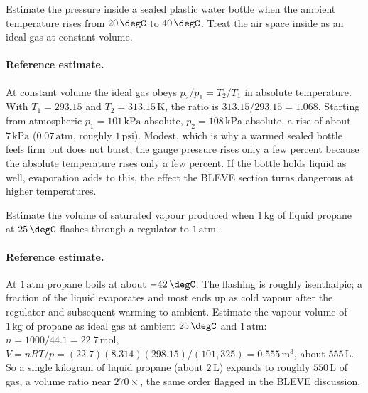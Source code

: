 \begin{exercise}
Estimate the pressure inside a sealed plastic water bottle when the
ambient temperature rises from $20\,\degC$ to $40\,\degC$. Treat the
air space inside as an ideal gas at constant volume.

\paragraph{Reference estimate.} At constant volume the ideal gas obeys
$p_2/p_1 = T_2/T_1$ in absolute temperature. With $T_1 = 293.15$ and
$T_2 = 313.15\,\si{\kelvin}$, the ratio is $313.15/293.15 = 1.068$.
Starting from atmospheric $p_1 = 101\,\text{kPa}$ absolute, $p_2 = 108\,
\text{kPa}$ absolute, a rise of about $7\,\text{kPa}$ ($0.07\,\text{atm}$,
roughly $1\,\text{psi}$). Modest, which is why a warmed sealed bottle
feels firm but does not burst; the gauge pressure rises only a few
percent because the absolute temperature rises only a few percent. If the
bottle holds liquid as well, evaporation adds to this, the effect the
BLEVE section turns dangerous at higher temperatures.
\end{exercise}

\begin{exercise}
Estimate the volume of saturated vapour produced when $1\,\text{kg}$
of liquid propane at $25\,\degC$ flashes through a regulator to
$1\,\text{atm}$.

\paragraph{Reference estimate.} At $1\,\text{atm}$ propane boils at about
$-42\,\degC$. The flashing is roughly isenthalpic; a fraction of the
liquid evaporates and most ends up as cold vapour after the regulator and
subsequent warming to ambient. Estimate the vapour volume of $1\,\text{kg}$
of propane as ideal gas at ambient $25\,\degC$ and $1\,\text{atm}$:
$n = 1000/44.1 = 22.7\,\text{mol}$, $V = nRT/p = (22.7)(8.314)(298.15)/
(101{,}325) = 0.555\,\text{m}^3$, about $555\,\text{L}$. So a single
kilogram of liquid propane (about $2\,\text{L}$) expands to roughly
$550\,\text{L}$ of gas, a volume ratio near $270\times$, the same order
flagged in the BLEVE discussion.
\end{exercise}

